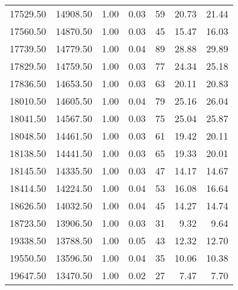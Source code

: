 \begin{table}
\begin{tabular}{rrrrrrr}
17529.50 & 14908.50 & 1.00 & 0.03 & 59 & 20.73 & 21.44 \\
17560.50 & 14870.50 & 1.00 & 0.03 & 45 & 15.47 & 16.03 \\
17739.50 & 14779.50 & 1.00 & 0.04 & 89 & 28.88 & 29.89 \\
17829.50 & 14759.50 & 1.00 & 0.03 & 77 & 24.34 & 25.18 \\
17836.50 & 14653.50 & 1.00 & 0.03 & 63 & 20.11 & 20.83 \\
18010.50 & 14605.50 & 1.00 & 0.04 & 79 & 25.16 & 26.04 \\
18041.50 & 14567.50 & 1.00 & 0.03 & 75 & 25.04 & 25.87 \\
18048.50 & 14461.50 & 1.00 & 0.03 & 61 & 19.42 & 20.11 \\
18138.50 & 14441.50 & 1.00 & 0.03 & 65 & 19.33 & 20.01 \\
18145.50 & 14335.50 & 1.00 & 0.03 & 47 & 14.17 & 14.67 \\
18414.50 & 14224.50 & 1.00 & 0.04 & 53 & 16.08 & 16.64 \\
18626.50 & 14032.50 & 1.00 & 0.04 & 45 & 14.27 & 14.74 \\
18723.50 & 13906.50 & 1.00 & 0.03 & 31 & 9.32 & 9.64 \\
19338.50 & 13788.50 & 1.00 & 0.05 & 43 & 12.32 & 12.70 \\
19550.50 & 13596.50 & 1.00 & 0.04 & 35 & 10.06 & 10.38 \\
19647.50 & 13470.50 & 1.00 & 0.02 & 27 & 7.47 & 7.70 \\
\bottomrule
\end{tabular}
\end{table}
